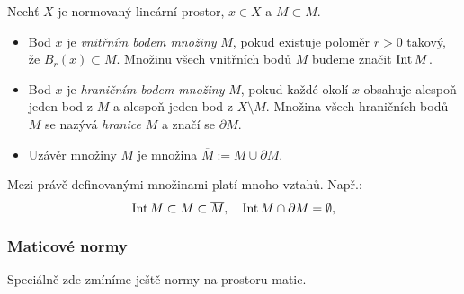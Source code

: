 \begin{df}
Nechť $X$ je normovaný lineární prostor, $x\in X$ a $M\subset M$.
\begin{itemize}
\item Bod $x$ je \emph{vnitřním bodem množiny} $M$, pokud existuje poloměr $r>0$ takový, že $B_r(x)\subset M$.
Množinu všech vnitřních bodů $M$ budeme značit $\operatorname{Int} M$.
\item Bod $x$ je \emph{hraničním bodem množiny} $M$, pokud každé okolí $x$ obsahuje alespoň jeden bod z $M$ a alespoň jeden bod z $X\setminus M$.
Množina všech hraničních bodů $M$ se nazývá \emph{hranice} $M$ a značí se $\partial M$.
\item Uzávěr množiny $M$ je množina $\overline M:=M\cup\partial M$.
\end{itemize}
\end{df}

Mezi právě definovanými množinami platí mnoho vztahů. Např.:
\[ \operatorname{Int} M\subset M \subset \overline M, \quad \operatorname{Int} M\cap \partial M = \emptyset, \]


\subsubsection{Maticové normy}

Speciálně zde zmíníme ještě normy na prostoru matic.

